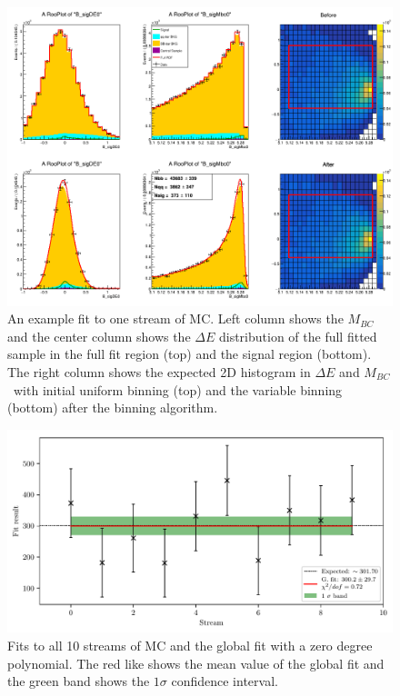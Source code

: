\documentclass[headings=standardclasses,headings=big,oneside,a4paper,openany,12pt]{scrbook}
\newcommand {\vars}{$\Delta E$ and $M_{BC}$}
\begin{document}
\begin{figure}[H]
	\centering
	\captionsetup{width=0.8\linewidth}
	\includegraphics[width=\linewidth]{fig/plt_uMVA1dc_0.png}
	\caption{An example fit to one stream of MC. Left column shows the $M_{BC}$ and the center column shows the $\Delta E$ distribution of the full fitted sample in the full fit region (top) and the signal region (bottom). The right column shows the expected 2D histogram in \vars~with initial uniform binning (top) and the variable binning (bottom) after the binning algorithm.}
	\label{fig:sig_streamfit}
\end{figure}

\begin{figure}[H]
	\centering
	\captionsetup{width=0.8\linewidth}
	\includegraphics[width=\linewidth]{fig/sig_global}
	\caption{Fits to all 10 streams of MC and the global fit with a zero degree polynomial. The red like shows the mean value of the global fit and the green band shows the $1\sigma$ confidence interval.}
	\label{fig:sig_global}
\end{figure}
\end{document}

